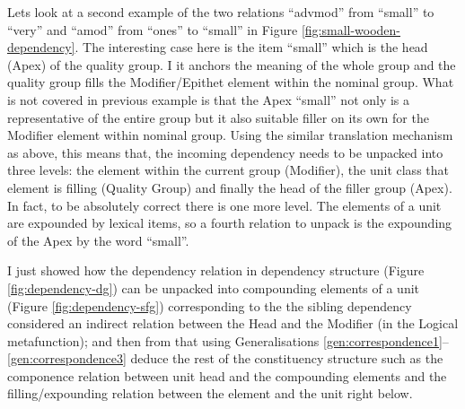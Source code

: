 Lets look at a second example of the two relations ``advmod'' from ``small'' to ``very'' and ``amod'' from ``ones'' to ``small'' in Figure \ref{fig:small-wooden-dependency}. The interesting case here is the item ``small'' which is the head (Apex) of the quality group. I it anchors the meaning of the whole group and the quality group fills the Modifier/Epithet element within the nominal group. What is not covered in previous example is that the Apex ``small'' not only is a representative of the entire group but it also suitable filler on its own for the Modifier element within nominal group. Using the similar translation mechanism as above, this means that, the incoming dependency needs to be unpacked into three levels: the element within the current group (Modifier), the unit class that element is filling (Quality Group) and finally the head of the filler group (Apex). In fact, to be absolutely correct there is one more level. The elements of a unit are expounded by lexical items, so a fourth relation to unpack is the expounding of the Apex by the word ``small''.

I just showed how the dependency relation in dependency structure (Figure \ref{fig:dependency-dg}) can be unpacked into compounding elements of a unit (Figure \ref{fig:dependency-sfg}) corresponding to the the sibling dependency considered an indirect relation between the Head and the Modifier (in the Logical metafunction); and then from that using Generalisations \ref{gen:correspondence1}--\ref{gen:correspondence3} deduce the rest of the constituency structure such as the componence relation between unit head and the compounding elements and the filling/expounding relation between the element and the unit right below. 



